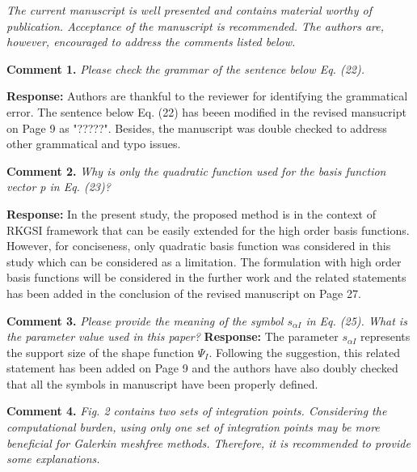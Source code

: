 \documentclass{article}
\begin{document}
\textit{The current manuscript is well presented and contains material worthy of publication. Acceptance of the manuscript is recommended. The authors are, however, encouraged to address the comments listed below.}

\textbf{Comment 1.} \textit{Please check the grammar of the sentence below Eq. (22).}

\textbf{Response:} Authors are thankful to the reviewer for identifying the grammatical error. The sentence below Eq. (22)  has beeen modified in the revised mansucript on Page 9 as "?????". Besides, the manuscript was double checked to address other grammatical and typo issues.

\textbf{Comment 2.} \textit{Why is only the quadratic function used for the basis function vector p in Eq. (23)?}

\textbf{Response:} In the present study, the proposed method is in the context of RKGSI framework that can be easily extended for the high order basis functions. However, for conciseness, only quadratic basis function was considered in this study which can be considered as a limitation. The formulation with high order basis functions will be considered in the further work and the related statements has been added  in the conclusion of the revised manuscript on Page 27.

\textbf{Comment 3.} \textit{Please provide the meaning of the symbol $s_{\alpha I}$ in Eq. (25). What is the parameter value used in this paper?}
\textbf{Response:} The parameter $s_{\alpha I}$ represents the support size of the shape function $\Psi_I$. Following the suggestion, this related statement has been added on Page 9 and the authors have also doubly checked that all the symbols in manuscript have been properly defined.

\textbf{Comment 4.} \textit{Fig. 2 contains two sets of integration points. Considering the computational burden, using only one set of integration points may be more beneficial for Galerkin meshfree methods. Therefore, it is recommended to provide some explanations.}
\end{document}

